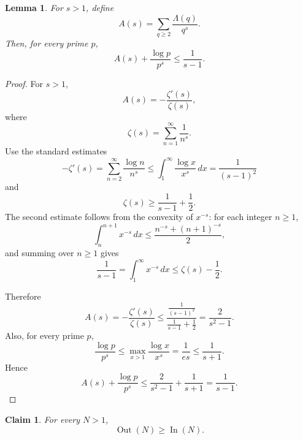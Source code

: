 \documentclass{amsart}
\newtheorem{claim}{Claim}
\newtheorem{lemma}{Lemma}
\begin{document}
\begin{lemma}\label{lem:analytic-estimate}
For \(s>1\), define
\[
A(s)=\sum_{q\geq 2}\frac{\Lambda(q)}{q^s}.
\]
Then, for every prime \(p\),
\[
A(s)+\frac{\log p}{p^s}
\leq
\frac{1}{s-1}.
\]
\end{lemma}

\begin{proof}
For \(s>1\),
\[
A(s)=-\frac{\zeta'(s)}{\zeta(s)},
\]
where
\[
\zeta(s)=\sum_{n=1}^{\infty}\frac{1}{n^s}.
\]
Use the standard estimates
\[
-\zeta'(s)
=
\sum_{n=2}^{\infty}\frac{\log n}{n^s}
\leq
\int_1^\infty \frac{\log x}{x^s}\,dx
=
\frac{1}{(s-1)^2}
\]
and
\[
\zeta(s)\geq \frac{1}{s-1}+\frac12.
\]
The second estimate follows from the convexity of \(x^{-s}\): for each integer \(n\geq 1\),
\[
\int_n^{n+1} x^{-s}\,dx
\leq
\frac{n^{-s}+(n+1)^{-s}}{2},
\]
and summing over \(n\geq 1\) gives
\[
\frac{1}{s-1}
=
\int_1^\infty x^{-s}\,dx
\leq
\zeta(s)-\frac12.
\]

Therefore
\[
A(s)
=
-\frac{\zeta'(s)}{\zeta(s)}
\leq
\frac{\frac{1}{(s-1)^2}}{\frac{1}{s-1}+\frac12}
=
\frac{2}{s^2-1}.
\]
Also, for every prime \(p\),
\[
\frac{\log p}{p^s}
\leq
\max_{x>1}\frac{\log x}{x^s}
=
\frac{1}{es}
\leq
\frac{1}{s+1}.
\]
Hence
\[
A(s)+\frac{\log p}{p^s}
\leq
\frac{2}{s^2-1}+\frac{1}{s+1}
=
\frac{1}{s-1}.
\]
\end{proof}

\begin{claim}
For every \(N>1\),
\[
\operatorname{Out}(N)\geq \operatorname{In}(N).
\]
\end{claim}
\end{document}
